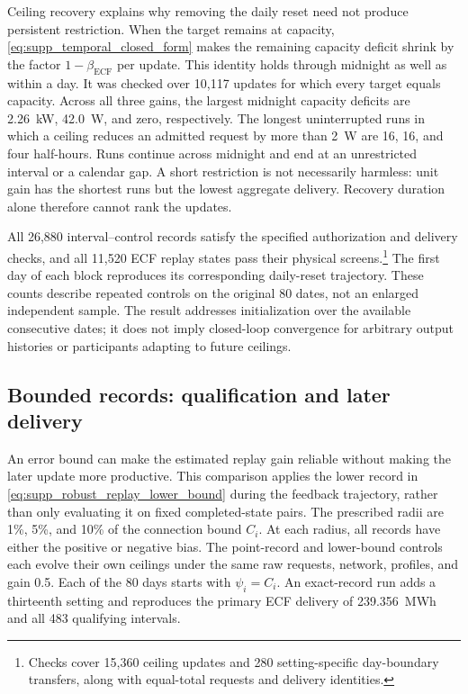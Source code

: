 \documentclass[11pt]{article}
\begin{document}
Ceiling recovery explains why removing the daily reset need not produce
persistent restriction. When the target remains at capacity,
\eqref{eq:supp_temporal_closed_form} makes the remaining capacity deficit
shrink by the factor $1-\beta_{\mathrm{ECF}}$ per update. This identity holds
through midnight as well as within a day. It was checked over 10,117 updates
for which every target equals capacity. Across all three gains, the largest
midnight capacity deficits are 2.26~kW, 42.0~W, and zero, respectively.
The longest uninterrupted runs in which a ceiling reduces an admitted request
by more than 2~W are 16, 16, and four half-hours. Runs continue across midnight
and end at an unrestricted interval or a calendar gap. A short restriction
is not necessarily harmless: unit gain has the shortest runs but the lowest
aggregate delivery. Recovery duration alone therefore cannot rank the updates.

All 26,880 interval--control records satisfy the specified authorization and
delivery checks, and all 11,520 ECF replay states pass their physical screens.\footnote{Checks
cover 15,360 ceiling updates and 280 setting-specific day-boundary transfers,
along with equal-total requests and delivery identities.}
The first day of each block reproduces its corresponding daily-reset
trajectory. These counts describe repeated controls on the original 80 dates,
not an enlarged independent sample. The result addresses initialization over
the available consecutive dates; it does not imply closed-loop convergence
for arbitrary output histories or participants adapting to future ceilings.

\subsection{Bounded records: qualification and later delivery}
\label{supp:bounded_record_dynamic}

An error bound can make the estimated replay gain reliable without making the later
update more productive. This comparison applies the lower record in
\eqref{eq:supp_robust_replay_lower_bound} during the feedback trajectory,
rather than only evaluating it on fixed completed-state pairs. The prescribed
radii are 1\%, 5\%, and 10\% of the connection bound $C_i$. At each radius,
all records have either the positive or negative bias. The point-record and
lower-bound controls each evolve their own ceilings under the same raw
requests, network, profiles, and gain 0.5. Each of the 80 days starts with
$\psi_i=C_i$.
An exact-record run adds a thirteenth setting and reproduces the primary ECF
delivery of 239.356~MWh and all 483 qualifying intervals.
\end{document}
